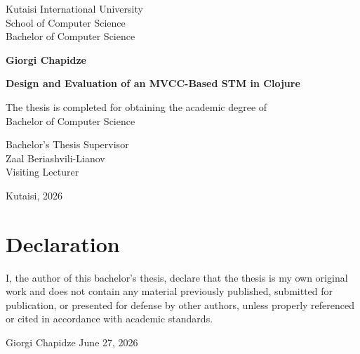 \documentclass[12pt, oneside]{report}
\begin{document}
\onehalfspacing

\begin{titlepage}
  \thispagestyle{empty}
  \centering

  {\fontsize{14}{17}\selectfont
    Kutaisi International University \\[4pt]
    School of Computer Science       \\[4pt]
    Bachelor of Computer Science     \par}

  \vspace{2cm}
  {\fontsize{16}{20}\selectfont\bfseries
    Giorgi Chapidze \par}

  \vspace{2cm}
  {\fontsize{16}{20}\selectfont\bfseries
    Design and Evaluation of an MVCC-Based STM in Clojure \par}

  \vspace{3cm}
  {\fontsize{14}{17}\selectfont
    The thesis is completed for obtaining the academic degree of \\[4pt]
    Bachelor of Computer Science \par}

  \vspace{3.5cm}
  {\fontsize{12}{15}\selectfont
    Bachelor's Thesis Supervisor \\[6pt]
    Zaal Beriashvili-Lianov      \\[4pt]
    Visiting Lecturer            \\[14pt]}

  \vfill
  {\fontsize{12}{15}\selectfont Kutaisi, 2026 \par}
\end{titlepage}


\chapter*{Declaration}

I, the author of this bachelor's thesis, declare that the thesis is my own original
work and does not contain any material previously published, submitted for publication,
or presented for defense by other authors, unless properly referenced or cited in
accordance with academic standards.

\vspace{1.5cm}
\noindent Giorgi Chapidze \hfill June 27, 2026
\end{document}
